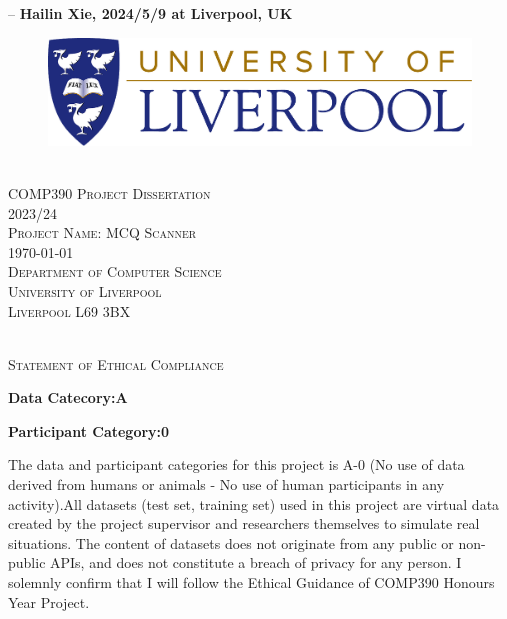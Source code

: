 \documentclass[twocolumn]{article}
\begin{document}
\hspace*{\fill}

        -- \textbf{Hailin Xie, 2024/5/9 at Liverpool, UK}
        



\newpage
\begin{titlepage}
    \begin{center}
        \begin{figure}[h]
            \centering
            \includegraphics[scale = 0.15]{liverpool logo.png}
        \end{figure}
        \textsc{\\[2.5cm]\Huge COMP390 Project Dissertation\\[0.5cm]}
        \textsc{\LARGE 2023/24\\[2cm]}
        \textsc{\huge Project Name: MCQ Scanner\\[1cm]}
        \textsc{\Large {\today}\\[8cm]}
        \textsc{\Large Department of Computer Science\\[0.5cm]}
        \textsc{\Large University of Liverpool\\[0.5cm]}
        \textsc{\Large Liverpool L69 3BX\\[0.5cm]}

    \end{center}
\end{titlepage}
\onecolumn
\begin{center}
    \textsc{\\[2cm]\Large Statement of Ethical Compliance\\[2cm]}
\end{center}


    \textbf{Data Catecory:A}

    \textbf{Participant Category:0}
    


    The data and participant categories for this project is A-0 (No use of data derived from humans or animals - No use of human participants in any activity).All datasets (test set, training set) used in this project are virtual data created by the project supervisor and researchers themselves to simulate real situations. The content of datasets does not originate from any public or non-public APIs, and does not constitute a breach of privacy for any person. I solemnly confirm that I will follow the Ethical Guidance of COMP390 Honours Year Project.
\end{document}
